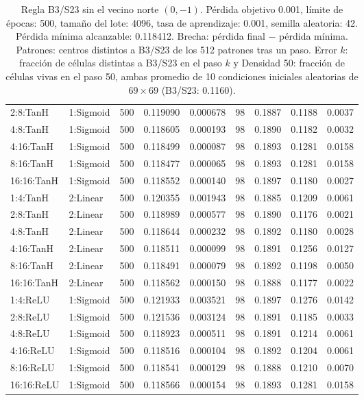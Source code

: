 \begin{table}[H]
\begin{tabular}{llrrrrrrr}
		2:8:TanH & 1:Sigmoid & 500 & 0.119090 & 0.000678 & 98 & 0.1887 & 0.1188 & 0.0037 \\
		4:8:TanH & 1:Sigmoid & 500 & 0.118605 & 0.000193 & 98 & 0.1890 & 0.1182 & 0.0032 \\
		4:16:TanH & 1:Sigmoid & 500 & 0.118499 & 0.000087 & 98 & 0.1893 & 0.1281 & 0.0158 \\
		8:16:TanH & 1:Sigmoid & 500 & 0.118477 & 0.000065 & 98 & 0.1893 & 0.1281 & 0.0158 \\
		16:16:TanH & 1:Sigmoid & 500 & 0.118552 & 0.000140 & 98 & 0.1897 & 0.1180 & 0.0027 \\
		\midrule
		1:4:TanH & 2:Linear & 500 & 0.120355 & 0.001943 & 98 & 0.1885 & 0.1209 & 0.0061 \\
		2:8:TanH & 2:Linear & 500 & 0.118989 & 0.000577 & 98 & 0.1890 & 0.1176 & 0.0021 \\
		4:8:TanH & 2:Linear & 500 & 0.118644 & 0.000232 & 98 & 0.1892 & 0.1180 & 0.0028 \\
		4:16:TanH & 2:Linear & 500 & 0.118511 & 0.000099 & 98 & 0.1891 & 0.1256 & 0.0127 \\
		8:16:TanH & 2:Linear & 500 & 0.118491 & 0.000079 & 98 & 0.1892 & 0.1198 & 0.0050 \\
		16:16:TanH & 2:Linear & 500 & 0.118562 & 0.000150 & 98 & 0.1888 & 0.1177 & 0.0022 \\
		\midrule
		1:4:ReLU & 1:Sigmoid & 500 & 0.121933 & 0.003521 & 98 & 0.1897 & 0.1276 & 0.0142 \\
		2:8:ReLU & 1:Sigmoid & 500 & 0.121536 & 0.003124 & 98 & 0.1891 & 0.1185 & 0.0033 \\
		4:8:ReLU & 1:Sigmoid & 500 & 0.118923 & 0.000511 & 98 & 0.1891 & 0.1214 & 0.0061 \\
		4:16:ReLU & 1:Sigmoid & 500 & 0.118516 & 0.000104 & 98 & 0.1892 & 0.1204 & 0.0061 \\
		8:16:ReLU & 1:Sigmoid & 500 & 0.118541 & 0.000129 & 98 & 0.1888 & 0.1210 & 0.0070 \\
		16:16:ReLU & 1:Sigmoid & 500 & 0.118566 & 0.000154 & 98 & 0.1893 & 0.1281 & 0.0158 \\
		\bottomrule
	\end{tabular}
	\caption{Regla B3/S23 sin el vecino norte $(0,-1)$. Pérdida objetivo 0.001, límite de épocas: 500, tamaño del lote: 4096, tasa de aprendizaje: 0.001, semilla aleatoria: 42. Pérdida mínima alcanzable: 0.118412. Brecha: pérdida final $-$ pérdida mínima. Patrones: centros distintos a B3/S23 de los 512 patrones tras un paso. Error $k$: fracción de células distintas a B3/S23 en el paso $k$ y Densidad 50: fracción de células vivas en el paso 50, ambas promedio de 10 condiciones iniciales aleatorias de $69\times69$ (B3/S23: 0.1160).}
	\label{tab:vecindad_n}
\end{table}
